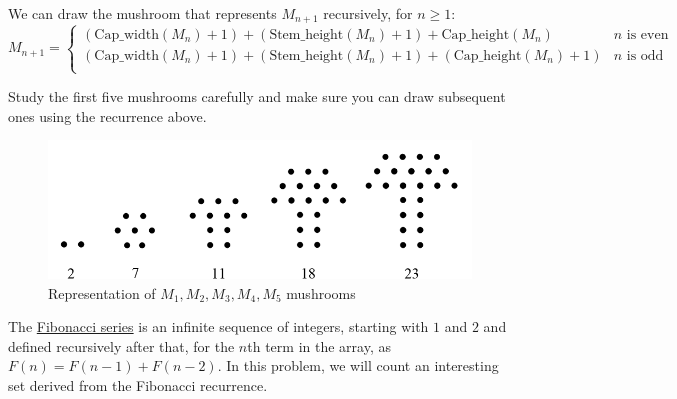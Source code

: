 \documentclass[addpoints]{exam}
\begin{document}
\begin{questions}
We can draw the mushroom that represents $M_{n+1}$ recursively, for $n \geq 1$:
\[ 
    M_{n+1}=
    \begin{cases} 
      (\textrm{Cap\_width}(M_n) + 1) + (\textrm{Stem\_height}(M_n) + 1) + \textrm{Cap\_height}(M_n)  & n \textrm{ is even} \\
      (\textrm{Cap\_width}(M_n) + 1) + (\textrm{Stem\_height}(M_n) + 1)  + (\textrm{Cap\_height}(M_n)+1) & n \textrm{ is odd}  \\      
   \end{cases}
\]

Study the first five mushrooms carefully and make sure you can draw subsequent ones using the recurrence above.

\begin{figure}[h]
  \centering
  \includegraphics{mushroom_series.png}
  \caption{Representation of $M_1,M_2,M_3,M_4,M_5$ mushrooms}
  \label{fig:mushroom_anatomy}
\end{figure}


\question
    The \href{https://en.wikipedia.org/wiki/Fibonacci_number}{Fibonacci series} is an infinite sequence of integers, starting with $1$ and $2$ and defined recursively after that, for the $n$th term in the array, as $F(n) = F(n-1) + F(n-2)$. In this problem, we will count an interesting set derived from the Fibonacci recurrence.
    

\end{questions}
\end{document}
